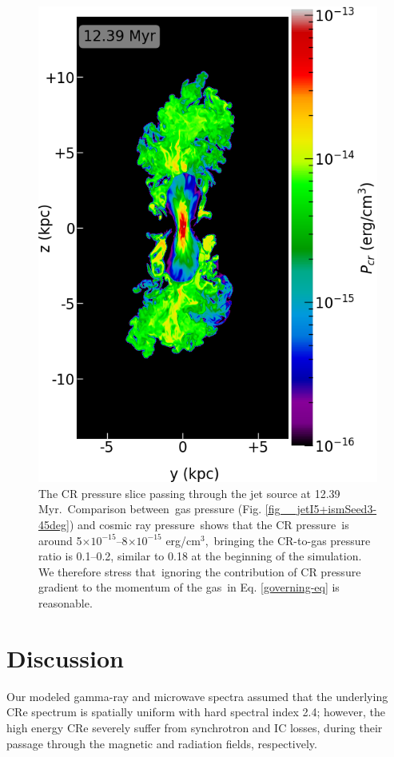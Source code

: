 \documentclass[fleqn,usenatbib,useAMS]{mnras}
\begin{document}
  \begin{figure}
    \includegraphics[width=\columnwidth]{figures/fig__jetI5+ismSeed3-45deg-CR.png}
    \caption{
     The CR pressure slice passing through the jet source at 12.39 Myr.\
     Comparison between\
     gas pressure (Fig. \ref{fig__jetI5+ismSeed3-45deg}) and cosmic ray pressure\
     shows that
     the CR pressure\
     is around 5$\times10^{-15}$--8$\times10^{-15}$ erg/cm$^{3}$,\
     bringing the CR-to-gas pressure ratio is 0.1--0.2,
     similar to 0.18 at the beginning of the simulation.
     We therefore stress that\
     ignoring the contribution of CR pressure gradient to the momentum of the gas\
     in Eq. \ref{governing-eq} is reasonable.
     }
    \label{fig__jetI5+ismSeed3-45deg-CR}
  \end{figure}

\section{Discussion}
Our modeled gamma-ray and microwave spectra assumed that
the underlying CRe spectrum is spatially uniform with hard spectral index 2.4;
however, the high energy CRe severely suffer from synchrotron and IC losses,
during their passage through the magnetic and radiation fields, respectively.
\end{document}

